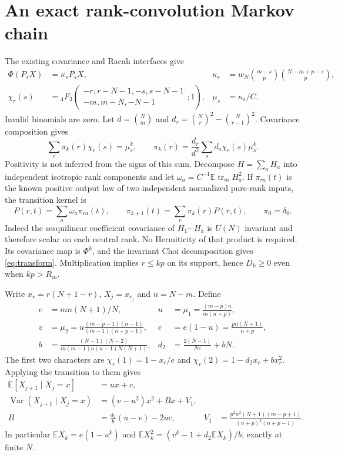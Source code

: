 \documentclass[11pt,a4paper]{article}
\newcommand{\EE}{\mathbb E}
\newcommand{\tr}{\operatorname{tr}}
\begin{document}
\newpage
\section{An exact rank-convolution Markov chain}
The existing covariance and Racah interfaces \cite{Kota,DLMF} give
\begin{align}
 \Phi(P_sX)&=\kappa_sP_sX,&
 \kappa_s&=w_N\binom{m-s}p\binom{N-m+p-s}p,\\
 \chi_r(s)&={}_4F_3\!\left(\begin{matrix}-r,r-N-1,-s,s-N-1\\
                  -m,m-N,-N-1\end{matrix};1\right),&
 \mu_s&=\kappa_s/C.
\end{align}
Invalid binomials are zero. Let $d=\binom Nm$ and
$d_r=\binom Nr^2-\binom N{r-1}^2$. Covariance composition gives
\begin{equation}
 \sum_r\pi_k(r)\chi_r(s)=\mu_s^k,\qquad
 \pi_k(r)=\frac{d_r}{d^2}\sum_s d_s\chi_r(s)\mu_s^k.
 \label{eq:transform}
\end{equation}
Positivity is not inferred from the signs of this sum. Decompose
$H=\sum_a H_a$ into independent isotropic rank components and let
$\omega_a=C^{-1}\EE\tr_mH_a^2$. If $\pi_{ra}(t)$ is the known
positive output law of two independent normalized pure-rank
inputs, the transition kernel is
\begin{equation}
 P(r,t)=\sum_a\omega_a\pi_{ra}(t),\qquad
 \pi_{k+1}(t)=\sum_r\pi_k(r)P(r,t),\qquad \pi_0=\delta_0.
\end{equation}
Indeed the sesquilinear coefficient covariance of $H_1\cdots H_k$
is $U(N)$ invariant and therefore scalar on each neutral rank.
No Hermiticity of that product is required. Its covariance map is
$\Phi^k$, and the invariant Choi decomposition gives
\eqref{eq:transform}. Multiplication implies $r\le kp$ on its
support, hence $D_k\ge0$ even when $kp>R_m$.

Write $x_r=r(N+1-r)$, $X_j=x_{r_j}$ and $n=N-m$. Define
\begin{align}
 e&=mn(N+1)/N,&u&=\mu_1=\frac{(m-p)n}{m(n+p)},\\
 v&=\mu_2=u\frac{(m-p-1)(n-1)}{(m-1)(n+p-1)},&
 c&=e(1-u)=\frac{pn(N+1)}{n+p},\\
 b&=\frac{(N-1)(N-2)}{m(m-1)n(n-1)N(N+1)},&
 d_2&=\frac{2(N-1)}{Ne}+bN.
\end{align}
The first two characters are $\chi_r(1)=1-x_r/e$ and
$\chi_r(2)=1-d_2x_r+bx_r^2$. Applying the transition to them gives
\begin{align}
 \EE[X_{j+1}\mid X_j=x]&=ux+c,\label{eq:meanstep}\\
 \operatorname{Var}(X_{j+1}\mid X_j=x)
   &=(v-u^2)x^2+Bx+V_1,\label{eq:varstep}\\
 B&=\frac{d_2}{b}(u-v)-2uc,&
 V_1&=\frac{p^2n^2(N+1)(m-p+1)}{(n+p)^2(n+p-1)}.
\end{align}
In particular $\EE X_k=e(1-u^k)$ and
$\EE X_k^2=(v^k-1+d_2\EE X_k)/b$, exactly at finite $N$.
\end{document}
